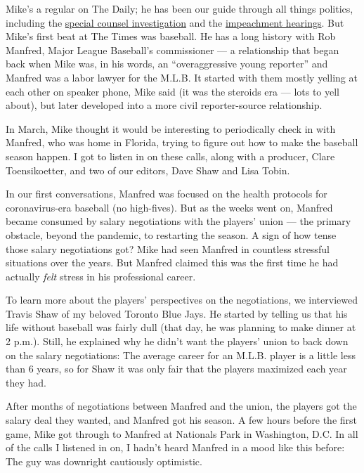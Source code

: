 Mike's a regular on The Daily; he has been our guide through all things
politics, including the
\href{https://www.nytimes3xbfgragh.onion/2019/05/30/podcasts/the-daily/mueller-special-counsel.html}{special
counsel investigation} and the
\href{https://www.nytimes3xbfgragh.onion/2019/11/13/podcasts/the-daily/impeachment-hearings.html}{impeachment
hearings}. But Mike's first beat at The Times was baseball. He has a
long history with Rob Manfred, Major League Baseball's commissioner ---
a relationship that began back when Mike was, in his words, an
``overaggressive young reporter'' and Manfred was a labor lawyer for the
M.L.B. It started with them mostly yelling at each other on speaker
phone, Mike said (it was the steroids era --- lots to yell about), but
later developed into a more civil reporter-source relationship.

In March, Mike thought it would be interesting to periodically check in
with Manfred, who was home in Florida, trying to figure out how to make
the baseball season happen. I got to listen in on these calls, along
with a producer, Clare Toensikoetter, and two of our editors, Dave Shaw
and Lisa Tobin.

In our first conversations, Manfred was focused on the health protocols
for coronavirus-era baseball (no high-fives). But as the weeks went on,
Manfred became consumed by salary negotiations with the players' union
--- the primary obstacle, beyond the pandemic, to restarting the season.
A sign of how tense those salary negotiations got? Mike had seen Manfred
in countless stressful situations over the years. But Manfred claimed
this was the first time he had actually \emph{felt} stress in his
professional career.

To learn more about the players' perspectives on the negotiations, we
interviewed Travis Shaw of my beloved Toronto Blue Jays. He started by
telling us that his life without baseball was fairly dull (that day, he
was planning to make dinner at 2 p.m.). Still, he explained why he
didn't want the players' union to back down on the salary negotiations:
The average career for an M.L.B. player is a little less than 6 years,
so for Shaw it was only fair that the players maximized each year they
had.

After months of negotiations between Manfred and the union, the players
got the salary deal they wanted, and Manfred got his season. A few hours
before the first game, Mike got through to Manfred at Nationals Park in
Washington, D.C. In all of the calls I listened in on, I hadn't heard
Manfred in a mood like this before: The guy was downright cautiously
optimistic.

